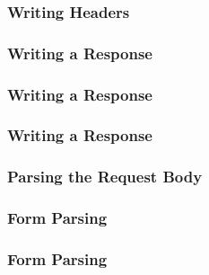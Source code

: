 \begin{frame}
  \frametitle{Writing Headers}
  
\end{frame}

\begin{frame}
  \frametitle{Writing a Response}
  
\end{frame}

\begin{frame}
  \frametitle{Writing a Response}
  
\end{frame}

\begin{frame}
  \frametitle{Writing a Response}
  
\end{frame}

\begin{frame}
  \frametitle{Parsing the Request Body}
  
\end{frame}

\begin{frame}
\end{frame}

\begin{frame}
  \frametitle{Form Parsing}
  
\end{frame}

\begin{frame}
  \frametitle{Form Parsing}
  
\end{frame}

